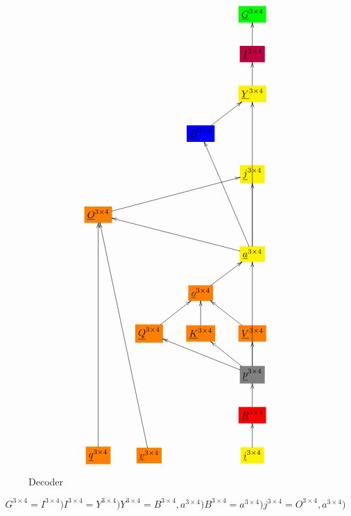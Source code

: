 \documentclass[12pt]{article}
\begin{document}
\begin{figure}[h!]\centering
$$\xymatrix{
&&&*+[F*:green]{\underline{G}^{3\times  4}}
\\
&&&*+[F*:purple]{\underline{I}^{3\times  4}}\ar[u]
\\
&&&*+[F*:yellow]{\underline{Y}^{3\times  4}}\ar[u]
\\
&&*+[F*:blue]{\underline{B}^{3\times  4}}\ar[ur]&
\\
&&&*+[F*:yellow]{\underline{j}^{3\times  4}}
\\
*+[F*:orange]{\underline{O}^{3\times  4}}\ar[urrr]&&&
\\
&&&*+[F*:yellow]{\underline{a}^{3\times  4}}\ar[uuuu]\ar[uuul]\ar[uu]\ar[ulll]
\\
&&*+[F*:orange]{\underline{o}^{3\times  4}}\ar[ur]&
\\
&*+[F*:orange]{\underline{Q}^{3\times  4}}\ar[ur]&*+[F*:orange]{\underline{K}^{3\times  4}}\ar[u]&*+[F*:orange]{\underline{V}^{3\times  4}}\ar[ul]
\\
&&&*+[F*:gray]{\underline{p}^{3\times  4}}\ar[uuu]\ar[ull]\ar[ul]\ar[u]
\\
&&&*+[F*:red]{\underline{R}^{3\times  4}}\ar[u]
\\
*+[F*:orange]{\underline{q}^{3\times  4}}\ar[uuuuuu]&*+[F*:orange]{\underline{v}^{3\times  4}}\ar[uuuuuul]&&*+[F*:yellow]{\underline{i}^{3\times  4}}\ar[u]
}$$
\caption{Decoder}
\label{fig-texnn-for-decoder}
\end{figure}\begin{subequations}
\begin{equation}
G^{3\times  4} = I^{3\times  4})
\label{eq-G-fun-decoder}
\end{equation}

\begin{equation}
I^{3\times  4} = Y^{3\times  4})
\label{eq-I-fun-decoder}
\end{equation}

\begin{equation}
Y^{3\times  4} = B^{3\times  4},a^{3\times  4})
\label{eq-Y-fun-decoder}
\end{equation}

\begin{equation}
B^{3\times  4} = a^{3\times  4})
\label{eq-B-fun-decoder}
\end{equation}

\begin{equation}
j^{3\times  4} = O^{3\times  4},a^{3\times  4})
\label{eq-j-fun-decoder}
\end{equation}


\end{subequations}
\end{document}
